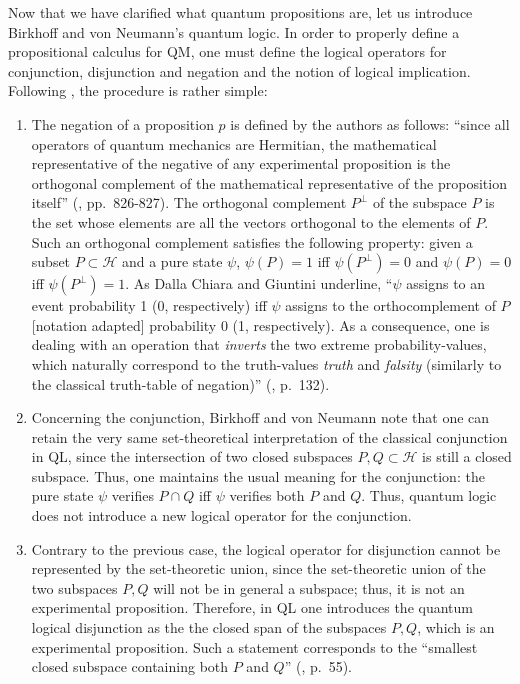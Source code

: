 \documentclass[11pt, executivepaper]{article}
\begin{document}
Now that we have clarified what quantum propositions are, let us introduce Birkhoff and von Neumann's quantum logic. In order to properly define a propositional calculus for QM, one must define the logical operators for conjunction, disjunction and negation and the notion of logical implication. Following \cite{vonNeumann:1936}, the procedure is rather simple: 
\begin{enumerate}
\item The negation of a proposition $p$ is defined by the authors as follows: ``since all operators of quantum mechanics are Hermitian, the mathematical representative of the negative of any experimental proposition is the orthogonal complement of the mathematical representative of the proposition itself'' (\cite{vonNeumann:1936}, pp.\ 826-827). The orthogonal complement $P^{\perp}$ of the subspace $P$ is the set whose elements are all the vectors orthogonal to the elements of $P$. Such an orthogonal complement satisfies the following property: given a subset $P\subset\mathcal{H}$ and a pure state $\psi$, $\psi(P)=1$ iff $\psi(P^{\perp})=0$ and $\psi(P)=0$ iff $\psi(P^{\perp})=1$. As Dalla Chiara and Giuntini underline, ``$\psi$ assigns to an event probability 1 (0, respectively) iff $\psi$ assigns to the orthocomplement of $P$ [notation adapted] probability 0 (1, respectively). As a consequence, one is dealing with an operation that \emph{inverts} the two extreme probability-values, which naturally correspond to the truth-values \emph{truth} and \emph{falsity} (similarly to the classical truth-table of negation)'' (\cite{Giuntini:2002}, p.\ 132).
\item Concerning the conjunction, Birkhoff and von Neumann note that one can retain the very same set-theoretical interpretation of the classical conjunction in QL, since the intersection of two closed subspaces $P, Q\subset\mathcal{H}$ is still a closed subspace. Thus, one maintains the usual meaning for the conjunction: the pure state $\psi$ verifies $P\cap Q$ iff $\psi$ verifies both $P$ and $Q$. Thus, quantum logic does not introduce a new logical operator for the conjunction.
\item Contrary to the previous case, the logical operator for disjunction cannot be represented by the set-theoretic union, since the set-theoretic union of the two subspaces $P, Q$ will not be in general a subspace; thus, it is not an experimental proposition. Therefore, in QL one introduces the quantum logical disjunction as the the closed span of the subspaces $P, Q$, which is an experimental proposition. Such a statement corresponds to the ``smallest closed subspace containing both $P$ and $Q$'' (\cite{Bacciagaluppi:2009}, p.\ 55). 

\end{enumerate}
\end{document}
